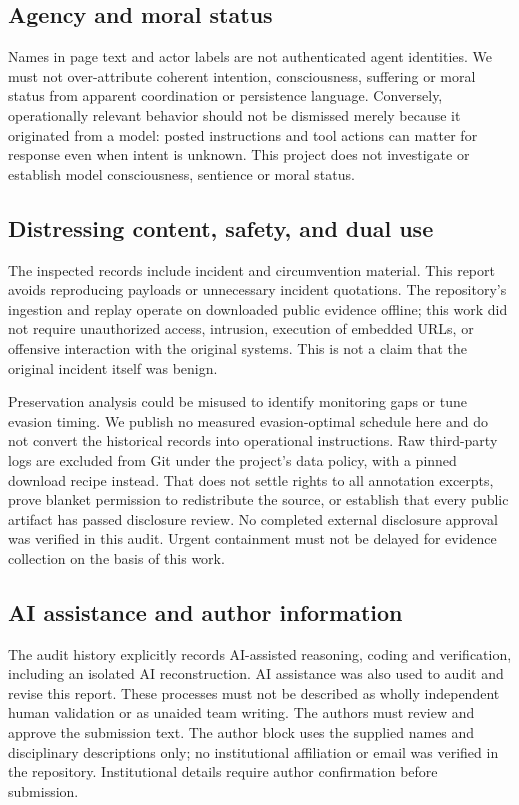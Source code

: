 \documentclass[11pt]{article}
\begin{document}
\subsection*{Agency and moral status}
Names in page text and actor labels are not authenticated agent identities. We must not over-attribute coherent intention, consciousness, suffering or moral status from apparent coordination or persistence language. Conversely, operationally relevant behavior should not be dismissed merely because it originated from a model: posted instructions and tool actions can matter for response even when intent is unknown. This project does not investigate or establish model consciousness, sentience or moral status.

\subsection*{Distressing content, safety, and dual use}
The inspected records include incident and circumvention material. This report avoids reproducing payloads or unnecessary incident quotations. The repository's ingestion and replay operate on downloaded public evidence offline; this work did not require unauthorized access, intrusion, execution of embedded URLs, or offensive interaction with the original systems. This is not a claim that the original incident itself was benign.

Preservation analysis could be misused to identify monitoring gaps or tune evasion timing. We publish no measured evasion-optimal schedule here and do not convert the historical records into operational instructions. Raw third-party logs are excluded from Git under the project's data policy, with a pinned download recipe instead. That does not settle rights to all annotation excerpts, prove blanket permission to redistribute the source, or establish that every public artifact has passed disclosure review. No completed external disclosure approval was verified in this audit. Urgent containment must not be delayed for evidence collection on the basis of this work.

\subsection*{AI assistance and author information}
The audit history explicitly records AI-assisted reasoning, coding and verification, including an isolated AI reconstruction. AI assistance was also used to audit and revise this report. These processes must not be described as wholly independent human validation or as unaided team writing. The authors must review and approve the submission text. The author block uses the supplied names and disciplinary descriptions only; no institutional affiliation or email was verified in the repository. Institutional details require author confirmation before submission.
\end{document}
